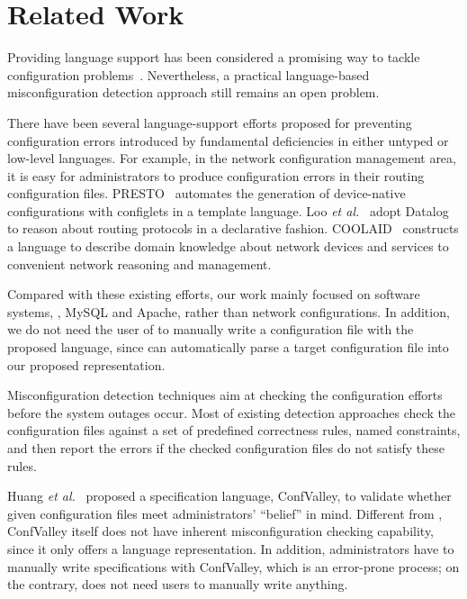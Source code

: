 
\section{Related Work}

Providing language support has been considered a promising way  
to tackle configuration problems~\cite{xu15systems}.
Nevertheless, a practical language-based misconfiguration
detection approach still remains an open problem.

There have been several language-support efforts proposed for preventing
configuration errors introduced by fundamental deficiencies in
either untyped or low-level languages. For example, in the network
configuration management area, it is easy for administrators to
produce configuration errors in their routing configuration files.
PRESTO~\cite{enck07configuration} 
automates the generation of device-native configurations
with configlets in a template language. 
Loo {\em et al.}~\cite{loo05declarative} adopt Datalog to reason about 
routing protocols in a declarative fashion. 
COOLAID~\cite{chen10declarative} constructs
a language to describe domain knowledge about network devices and
services to convenient network reasoning and management.

Compared with these existing efforts, 
our work mainly focused on software systems, \eg, MySQL and Apache,
rather than network configurations. In addition, we do not need 
the user of \app to manually write a configuration file with the proposed
language, since \app can automatically parse a target configuration
file into our proposed representation.

Misconfiguration detection techniques aim at checking the configuration
efforts before the system outages occur.
Most of existing detection approaches check 
the configuration files against a set of predefined correctness 
rules, named constraints, and then report the errors if 
the checked configuration files do not satisfy these rules.

Huang {\em et al.}~\cite{huang15confvalley} proposed a specification 
language, ConfValley, to validate 
whether given configuration files meet administrators' 
``belief'' in mind. Different from \app, ConfValley itself does not
have inherent misconfiguration checking capability, since it only offers
a language representation. In addition, administrators have to
manually write specifications with ConfValley, which is an error-prone
process; on the contrary, \app does not need users to manually
write anything.

